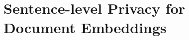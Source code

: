 \graphicspath{{./chapters/chapter3/}}
\chapter{Sentence-level Privacy for Document Embeddings}





